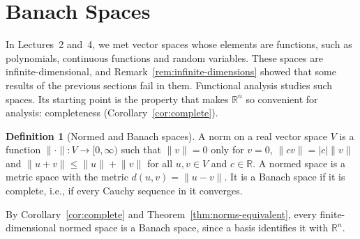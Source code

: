 \documentclass[11pt]{article}
\newcommand{\norm}[1]{\lVert #1 \rVert}
\theoremstyle{definition}
\newtheorem{definition}{Definition}[section]
\theoremstyle{plain}
\theoremstyle{remark}
\begin{document}
\section{Banach Spaces}\label{sec:banach}

In Lectures~2 and~4, we met vector spaces whose elements are functions, such as polynomials, continuous functions and random variables. These spaces are infinite-dimensional, and Remark~\ref{rem:infinite-dimensions} showed that some results of the previous sections fail in them. Functional analysis studies such spaces. Its starting point is the property that makes $\mathbb{R}^n$ so convenient for analysis: completeness (Corollary~\ref{cor:complete}).

\begin{definition}[Normed and Banach spaces]\label{def:banach}
    A norm on a real vector space $V$ is a function $\norm{\cdot}: V \to [0, \infty)$ such that $\norm{v} = 0$ only for $v = 0$, $\norm{cv} = |c|\norm{v}$ and $\norm{u + v} \leq \norm{u} + \norm{v}$ for all $u, v \in V$ and $c \in \mathbb{R}$. A normed space is a metric space with the metric $d(u, v) = \norm{u - v}$. It is a Banach space if it is complete, i.e., if every Cauchy sequence in it converges.
\end{definition}

By Corollary~\ref{cor:complete} and Theorem~\ref{thm:norms-equivalent}, every finite-dimensional normed space is a Banach space, since a basis identifies it with $\mathbb{R}^n$.
\end{document}
